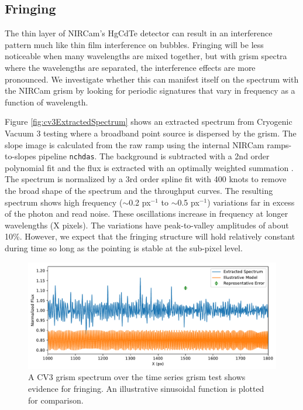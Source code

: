 \documentclass{aastex62}
\begin{document}
\subsection{Fringing}

The thin layer of NIRCam's HgCdTe detector can result in an interference pattern much like thin film interference on bubbles.
Fringing will be less noticeable when many wavelengths are mixed together, but with grism spectra where the wavelengths are separated, the interference effects are more pronounced.
We investigate whether this can manifest itself on the spectrum with the NIRCam grism by looking for periodic signatures that vary in frequency as a function of wavelength.

Figure \ref{fig:cv3ExtractedSpectrum} shows an extracted spectrum from Cryogenic Vacuum 3 testing where a broadband point source is dispersed by the grism.
The slope image is calculated from the raw ramp using the internal NIRCam ramps-to-slopes pipeline \texttt{nchdas}.
The background is subtracted with a 2nd order polynomial fit and the flux is extracted with an optimally weighted summation \citep[e.g.][]{horne1986optimalE}.
The spectrum is normalized by a 3rd order spline fit with 400 knots to remove the broad shape of the spectrum and the throughput curves.
The resulting spectrum shows high frequency ($\sim$0.2 px$^{-1}$ to $\sim$0.5 px$^{-1}$) variations far in excess of the photon and read noise.
These oscillations increase in frequency at longer wavelengths (X pixels).
The variations have peak-to-valley amplitudes of about 10\%.
However, we expect that the fringing structure will hold relatively constant during time so long as the pointing is stable at the sub-pixel level.

\begin{figure}[!hbtp]
\centering
\includegraphics[width=.99\columnwidth]{fringing_grism_cv3.pdf}
\caption{A CV3 grism spectrum over the time series grism test shows evidence for fringing.
An illustrative sinusoidal function is plotted for comparison.
}\label{fig:CV3GrismSpecFringing}
\end{figure}
\end{document}
